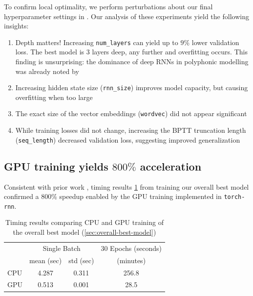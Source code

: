To confirm local optimality, we perform perturbations about our final
hyperparameter settings in
.
Our analysis of these experiments yield the following insights:
\begin{enumerate}
  \item Depth matters! Increasing \texttt{num\_layers} can yield up to $9\%$ lower validation loss.
    The best model is $3$ layers deep, any further and overfitting occurs.
    This finding is unsurprising: the dominance of deep RNNs in polyphonic
    modelling was already noted by \citet{pascanu2013construct}
  \item Increasing hidden state size (\texttt{rnn\_size}) improves model capacity, but causing overfitting when too large
  \item The exact size of the vector embeddings (\texttt{wordvec}) did not appear significant
  \item While training losses did not change, increasing the BPTT truncation length (\texttt{seq\_length})
    decreased validation loss, suggesting improved generalization
\end{enumerate}

\subsection{GPU training yields $800\%$ acceleration}

Consistent with prior work \citep{sutskever2014sequence,kaiser2015neural},
timing results \cref{tab:gpu-training} from training our overall best model
confirmed a $800\%$ speedup enabled by the GPU training implemented in
\texttt{torch-rnn}.

\begin{table}[tb]
  \centering
  \caption{Timing results comparing CPU and GPU training of the overall best model (\vref{sec:overall-best-model})}
  \label{tab:gpu-training}
  \begin{tabular}{l c c c}
    \toprule
    \multirow{2}{*}{} & \multicolumn{2}{c}{Single Batch} & 30 Epochs (seconds) \\
    \cmidrule{2-4}
    & mean (sec) & std (sec) & (minutes)\\
    \midrule
    CPU & 4.287 & 0.311 & 256.8\\
    GPU & 0.513 & 0.001 &  28.5\\
    \bottomrule
  \end{tabular}
\end{table}

